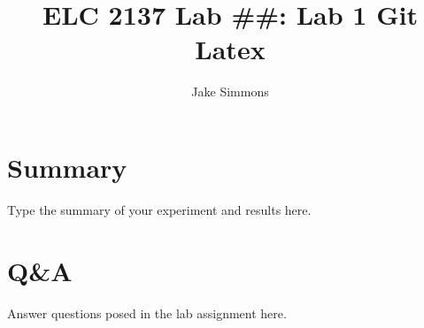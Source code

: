 \documentclass[11pt]{article}
\begin{document}
\title{ELC 2137 Lab \#\#: Lab 1 Git Latex}
\author{Jake Simmons}

\maketitle


\section*{Summary}

Type the summary of your experiment and results here.  


\section*{Q\&A}

Answer questions posed in the lab assignment here.
\end{document}

